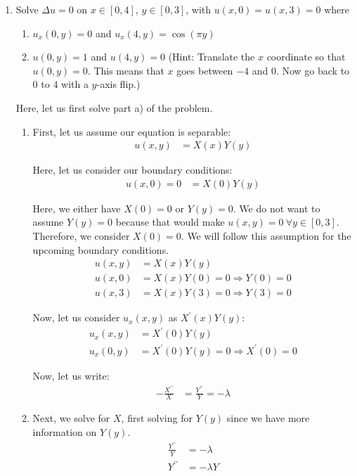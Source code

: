 \documentclass{article}
\begin{document}
%
%
\begin{enumerate}
  \item Solve $\Delta u = 0$ on $x \in [0, 4]$, $y \in [0, 3]$, with $u(x, 0) = u(x, 3) = 0$ where

  \begin{enumerate}
    \item $u_x(0, y) = 0$ and $u_x(4, y) = \cos(\pi y)$

    \item $u(0, y) = 1$ and $u(4, y) = 0$ (Hint: Translate the $x$ coordinate so that $u(0, y) = 0$. This means that $x$ goes between $-4$ and $0$. Now go back to $0$ to $4$ with a $y$-axis flip.)
  \end{enumerate}
\bigbreak
  Here, let us first solve part a) of the problem.
  \begin{enumerate}
    \item First, let us assume our equation is separable:
    \begin{align}
      u(x, y) & = X(x)Y(y)
    \end{align}

    Here, let us consider our boundary conditions:
    \begin{align}
      u(x, 0) = 0 & = X(0)Y(y)
    \end{align}

    Here, we either have $X(0) = 0$ or $Y(y) = 0$. We do not want to assume $Y(y) = 0$ because that would make $u(x, y) = 0 \ \forall y \in [0, 3]$. Therefore, we consider $X(0) = 0$. We will follow this assumption for the upcoming boundary conditions.
    \begin{align}
      u(x, y) & = X(x)Y(y)\\
      u(x, 0) & = X(x)Y(0) = 0 \Rightarrow Y(0) = 0\\
      u(x, 3) & = X(x)Y(3) = 0 \Rightarrow Y(3) = 0
    \end{align}

    Now, let us consider $u_x(x, y)$ as $X^\prime(x)Y(y)$:
    \begin{align}
      u_x(x, y) & = X^\prime(0) Y(y)\\
      u_x(0, y) & = X^\prime(0) Y(y) = 0
      \Rightarrow X^\prime(0) = 0
    \end{align}

    Now, let us write:
    \begin{align}
      - \frac{X^{\prime\prime}}{X} & = \frac{Y^{\prime\prime}}{Y} = - \lambda
    \end{align}
    \item Next, we solve for $X$, first solving for $Y(y)$ since we have more information on $Y(y)$.
    \begin{align}
      \frac{Y^{\prime\prime}}{Y} & = -\lambda\\
      Y^{\prime\prime} & = - \lambda Y
    \end{align}


\end{enumerate}
\end{enumerate}
\end{document}
